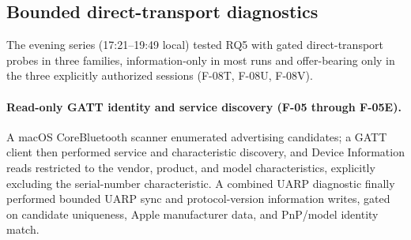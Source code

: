 \documentclass[11pt,letterpaper]{article}
\begin{document}
\subsection{Bounded direct-transport diagnostics}\label{sec:methods-transport}
The evening series (17:21--19:49 local) tested RQ5 with gated direct-transport probes in three families, information-only in most runs and offer-bearing only in the three explicitly authorized sessions (F-08T, F-08U, F-08V).

\paragraph{Read-only GATT identity and service discovery (F-05 through F-05E).}
A macOS CoreBluetooth scanner enumerated advertising candidates; a GATT client then performed service and characteristic discovery, and Device Information reads restricted to the vendor, product, and model characteristics, explicitly excluding the serial-number characteristic. A combined UARP diagnostic finally performed bounded UARP sync and protocol-version information writes, gated on candidate uniqueness, Apple manufacturer data, and PnP/model identity match.
\end{document}
